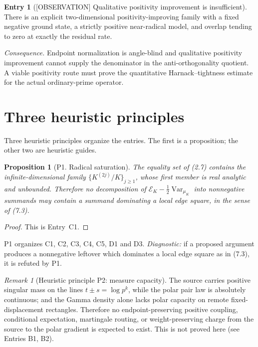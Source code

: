 \documentclass[11pt]{amsart}
\newtheorem{proposition}[theorem]{Proposition}
\theoremstyle{definition}
\newcounter{family}
\newtheorem{entry}{Entry}[family]
\theoremstyle{remark}
\newtheorem{remark}[theorem]{Remark}
\newcommand{\EK}{\mathscr E_K}
\DeclareMathOperator{\Var}{Var}
\newcommand{\OBS}{\textup{[OBSERVATION]}}
\begin{document}
\begin{entry}[\OBS{} Qualitative positivity improvement is insufficient]
\label{ent:H5}
There is an explicit two-dimensional positivity-improving family with a
fixed negative ground state, a strictly positive near-radical model, and
overlap tending to zero at exactly the residual rate.
\end{entry}

\emph{Consequence.} Endpoint normalization is angle-blind and qualitative
positivity improvement cannot supply the denominator in the
anti-orthogonality quotient.  A viable positivity route must prove the
quantitative Harnack--tightness estimate for the actual ordinary-prime
operator.

\section{Three heuristic principles}
\label{sec:principles}

Three heuristic principles organize the entries.  The first is a
proposition; the other two are heuristic guides.

\begin{proposition}[P1. Radical saturation]
The equality set of (2.7) contains the infinite-dimensional family
\(\{K^{(2j)}/K\}_{j\ge1}\), whose first member is real analytic and
unbounded.  Therefore no decomposition of
\(\EK-\frac12\Var_{\mu_K}\) into nonnegative summands may contain a
summand dominating a local edge square, in the sense of (7.3).
\end{proposition}

\begin{proof}
This is Entry~C1.
\end{proof}

P1 organizes C1, C2, C3, C4, C5, D1 and D3.  \emph{Diagnostic:} if a
proposed argument produces a nonnegative leftover which dominates a local
edge square as in (7.3), it is refuted by P1.

\begin{remark}[Heuristic principle P2: measure capacity]
The source carries positive singular mass on the lines
\(t\pm s=\log p^k\), while the polar pair law is absolutely continuous;
and the Gamma density alone lacks polar capacity on remote
fixed-displacement rectangles.  Therefore no endpoint-preserving positive
coupling, conditional expectation, martingale routing, or weight-preserving
charge from the source to the polar gradient is expected to exist.  This
is not proved here (see Entries B1, B2).
\end{remark}
\end{document}
